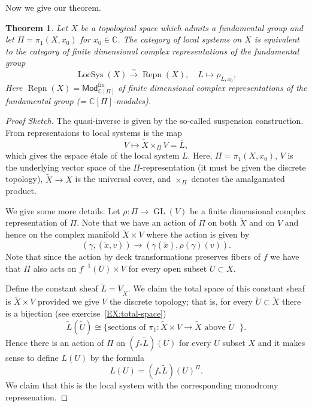 \documentclass[12pt]{book}
\numberwithin{equation}{section}
\newtheorem{theorem}{Theorem}[subsection]
\theoremstyle{definition}
\theoremstyle{remark}
\newcommand{\CC}{\mathbb{C}}
\newcommand{\GL}{\operatorname{GL}}
\newcommand{\LocSys}{\operatorname{LocSys}}
\newcommand{\Mod}{\mathsf{Mod}}
\newcommand{\fin}{\operatorname{fin}}
\newcommand{\Repn}{\operatorname{Repn}}
\begin{document}
Now we give our theorem.
\begin{theorem}
	Let $X$ be a topological space which admits a fundamental group and let $\Pi = \pi_1(X,x_0)$ for $x_0\in \CC$. 
	The category of local systems on $X$ is equivalent to the category of finite dimensional complex representations of the fundamental group 
	$$ \LocSys(X) \xrightarrow{\sim} \Repn(X), \quad L \mapsto \rho_{L,x_0},$$
	Here $\Repn(X)=\Mod_{\CC[\Pi]}^{\fin}$ of finite dimensional complex representations of the fundamental group (= $\CC[\Pi]$-modules).
\end{theorem}
\begin{proof}[Proof Sketch]
	The quasi-inverse is given by the so-called suspension construction. 
	From representaions to local systems is the map
	 $$ V \mapsto \widetilde{X} \times_{\Pi} V = \overline{L},$$
	which gives the espace \'etale of the local system $L$. 
	Here, $\Pi = \pi_1(X,x_0)$, $V$ is the underlying vector space of the $\Pi$-representation (it must be given the discrete topology), $\widetilde{X} \to X$ is the universal cover, and $\times_{\Pi}$ denotes the amalgamated product.
	
	We give some more details.
	Let $\rho: \Pi \to \GL(V)$ be a finite dimensional complex representation of $\Pi$.
	Note that we have an action of $\Pi$ on both $\widetilde{X}$ and on $V$ and hence on the complex manifold $\widetilde{X}\times V$ where the action is given by 
	$$(\gamma, (\widetilde{x},v))\to (\gamma(\widetilde{x}), \rho(\gamma)(v)).$$
	Note that since the action by deck transformations preserves fibers of $f$ we have that $\Pi$ also acts on $f^{-1}(U) \times V$ for every open subset $U \subset X$. 
	
	Define the constant sheaf $ \widetilde{L} = \underline{V}_{\widetilde{X}}.$
	We claim the total space of this constant sheaf is $\widetilde{X}\times V$ provided we give $V$ the discrete topology; that is, for every $\widetilde{U} \subset \widetilde{X}$ there is a bijection (see exercise~\ref{EX:total-space})
	\begin{equation}\label{E:total-space}
	\widetilde{L}(\widetilde{U})  \cong \lbrace \mbox{sections of $\pi_1: \widetilde{X}\times V \to \widetilde{X}$ above $\widetilde{U}$ } \rbrace.
	\end{equation}
	Hence there is an action of  $\Pi$ on $(f_*\widetilde{L})(U)$ for every $U$ subset $X$ and it makes sense to define $L(U)$ by the formula 
	$$ L(U) = (f_*\widetilde{L})(U)^{\Pi}. $$
	We claim that this is the local system with the corresponding monodromy represenation.
\end{proof}
\end{document}
